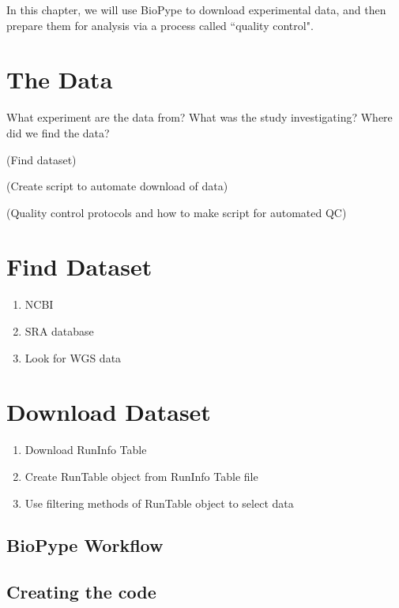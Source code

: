 In this chapter, we will use BioPype to download experimental data, and then prepare them for analysis via a process called 
``quality control".

    \section{The Data}
        What experiment are the data from? 
        What was the study investigating? 
        Where did we find the data?



(Find dataset)

(Create script to automate download of data)

(Quality control protocols and how to make script for automated QC)

    \section{Find Dataset}
        \begin{enumerate}
            \item NCBI
            \item SRA database
            \item Look for WGS data
        \end{enumerate}
    \section{Download Dataset}
        \begin{enumerate}
            \item Download RunInfo Table
            \item Create RunTable object from RunInfo Table file
            \item Use filtering methods of RunTable object to select data
        \end{enumerate}
    
        \subsection{BioPype Workflow}
        
        \subsection{Creating the code}
        
    
